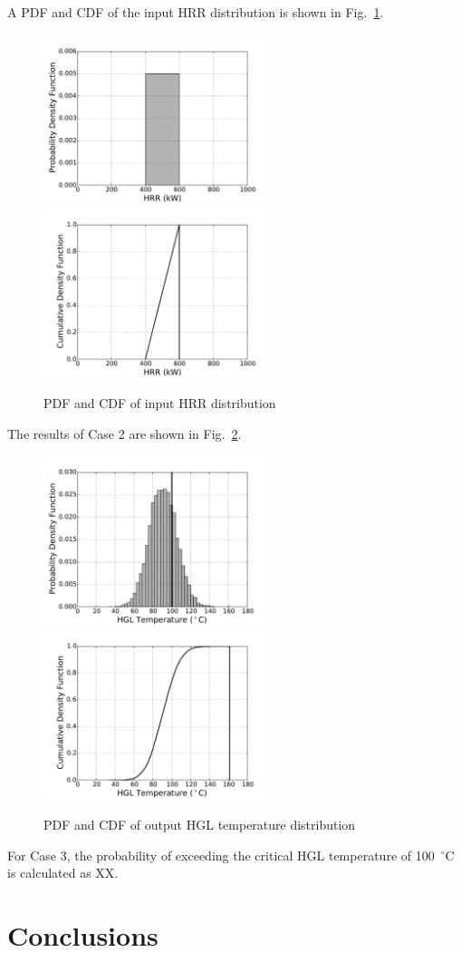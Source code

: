 \documentclass[12pt]{article}
\begin{document}
\clearpage


A PDF and CDF of the input HRR distribution is shown in Fig.~\ref{fig:case_3_input_distributions}.

\begin{figure}[!ht]
\includegraphics[width=2.6in]{Figures/input_PDF}
\includegraphics[width=2.6in]{Figures/input_CDF}
\caption{PDF and CDF of input HRR distribution}
\label{fig:case_3_input_distributions}
\end{figure}

The results of Case 2 are shown in Fig.~\ref{fig:case_3_output_distributions}.

\begin{figure}[!ht]
\includegraphics[width=2.6in]{Figures/output_PDF_3_combined}
\includegraphics[width=2.6in]{Figures/output_CDF_3_combined}
\caption{PDF and CDF of output HGL temperature distribution}
\label{fig:case_3_output_distributions}
\end{figure}

For Case 3, the probability of exceeding the critical HGL temperature of 100~$^\circ$C is calculated as XX.


\section{Conclusions}
\label{sec:conclusions}




\end{document}
